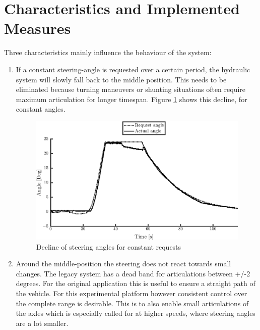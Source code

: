 \documentclass[root.tex]{subfiles}
\begin{document}
	
	{\pagestyle{empty}}
	\section{Characteristics and Implemented Measures}
	\label{chap:Delays}
	
	Three characteristics mainly influence the behaviour of the system: 
	
	\begin{enumerate}
		\item If a constant steering-angle is requested over a certain period, the hydraulic system will slowly fall back to the middle position. This needs to be eliminated because turning maneuvers or shunting situations often require maximum articulation for longer timespan. Figure \ref{fig:Constant_request} shows this decline, for constant angles.
		
		\begin{figure}[!h]
			
			\includegraphics[width=1\linewidth]{front}
			\caption[Decline of steering angles for constant requests]{Decline of steering angles for constant requests}
			
			\label{fig:Constant_request}
		\end{figure}
		
		\item Around the middle-position the steering does not react towards small changes. The legacy system has a dead band for articulations between +/-2 degrees. For the original application this is useful to ensure a straight path of the vehicle. For this experimental platform however consistent control over the complete range is desirable. This is to also enable small articulations of the axles which is especially called for at higher speeds, where steering angles are a lot smaller. 
		

\end{enumerate}
\end{document}
